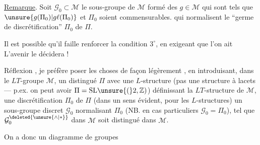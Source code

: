 \uline{Remarque}. Soit \(\mathcal{G}_0\subset\mathcal{M}\) le sous-groupe de \(\mathcal{M}\) formé des \(g\in\mathcal{M}\) qui sont tels que \(\unsure{g(\Pi_0)|g\ell(\Pi_0)}\) et \(\Pi_0\) soient commensurables.   qui normalisent le ``germe de discrétification'' \(\Pi_0\) de \(\Pi\).


Il est possible qu'il faille renforcer la condition \(3^\circ\), en exigeant que l'on ait
L'avenir le décidera !


Réflexion , je préfère poser les choses de façon légèrement , en introduisant, dans le \(LT\)-groupe  \(\mathcal{M}\), un   distingué \(\Pi\) avec une \(L\)-structure (pas  une structure à lacets --- p.ex. on peut avoir \(\Pi=\mathrm{SL}\unsure{(}2,\mathbb{Z})\)) définissant la \(LT\)-structure de \(\mathcal{M}\), une discrétification \(\Pi_0\) de \(\Pi\) (dans un sens évident, pour les \(L\)-structures) un sous-groupe discret \(\mathcal{G}_0\)  normalisant \(\Pi_0\) (NB. en cas particuliers   \(\mathcal{G}_0=\Pi_0\)), tel que  \(\mathcal{G}_0^{\deleted{\unsure{\wedge|*}}}\)  dans \(\mathcal{M}\) soit distingué dans \(\mathcal{M}\).

On a donc un diagramme de groupes

